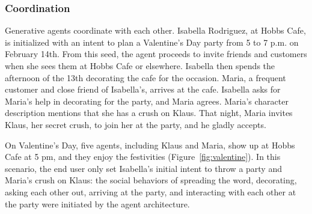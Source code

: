 \subsubsection{Coordination} 
Generative agents coordinate with each other. Isabella Rodriguez, at Hobbs Cafe, is initialized with an intent to plan a Valentine's Day party from 5 to 7 p.m. on February 14th. From this seed, the agent proceeds to invite friends and customers when she sees them at Hobbs Cafe or elsewhere. Isabella then spends the afternoon of the 13th decorating the cafe for the occasion. Maria, a frequent customer and close friend of Isabella's, arrives at the cafe. Isabella asks for Maria's help in decorating for the party, and Maria agrees. Maria's character description mentions that she has a crush on Klaus. That night, Maria invites Klaus, her secret crush, to join her at the party, and he gladly accepts.

On Valentine's Day, five agents, including Klaus and Maria, show up at Hobbs Cafe at 5 pm, and they enjoy the festivities (Figure~\ref{fig:valentine}). In this scenario, the end user only set Isabella's initial intent to throw a party and Maria's crush on Klaus: the social behaviors of spreading the word, decorating, asking each other out, arriving at the party, and interacting with each other at the party were initiated by the agent architecture.

